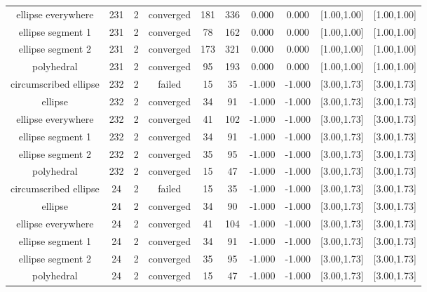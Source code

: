 \begin{tiny}
\begin{center}
\begin{tabular}{ c c c c c c c c c c }
    ellipse everywhere    &  231  &  2  & converged  &  181  &  336  &   0.000    &   0.000    & [1.00,1.00] & [1.00,1.00] \\
    ellipse segment 1     &  231  &  2  & converged  &   78  &  162  &   0.000    &   0.000    & [1.00,1.00] & [1.00,1.00] \\
    ellipse segment 2     &  231  &  2  & converged  &  173  &  321  &   0.000    &   0.000    & [1.00,1.00] & [1.00,1.00] \\
        polyhedral        &  231  &  2  & converged  &   95  &  193  &   0.000    &   0.000    & [1.00,1.00] & [1.00,1.00] \\
  circumscribed ellipse   &  232  &  2  &   failed   &   15  &   35  &   -1.000   &   -1.000   & [3.00,1.73] & [3.00,1.73] \\
         ellipse          &  232  &  2  & converged  &   34  &   91  &   -1.000   &   -1.000   & [3.00,1.73] & [3.00,1.73] \\
    ellipse everywhere    &  232  &  2  & converged  &   41  &  102  &   -1.000   &   -1.000   & [3.00,1.73] & [3.00,1.73] \\
    ellipse segment 1     &  232  &  2  & converged  &   34  &   91  &   -1.000   &   -1.000   & [3.00,1.73] & [3.00,1.73] \\
    ellipse segment 2     &  232  &  2  & converged  &   35  &   95  &   -1.000   &   -1.000   & [3.00,1.73] & [3.00,1.73] \\
        polyhedral        &  232  &  2  & converged  &   15  &   47  &   -1.000   &   -1.000   & [3.00,1.73] & [3.00,1.73] \\
  circumscribed ellipse   &   24  &  2  &   failed   &   15  &   35  &   -1.000   &   -1.000   & [3.00,1.73] & [3.00,1.73] \\
         ellipse          &   24  &  2  & converged  &   34  &   90  &   -1.000   &   -1.000   & [3.00,1.73] & [3.00,1.73] \\
    ellipse everywhere    &   24  &  2  & converged  &   41  &  104  &   -1.000   &   -1.000   & [3.00,1.73] & [3.00,1.73] \\
    ellipse segment 1     &   24  &  2  & converged  &   34  &   91  &   -1.000   &   -1.000   & [3.00,1.73] & [3.00,1.73] \\
    ellipse segment 2     &   24  &  2  & converged  &   35  &   95  &   -1.000   &   -1.000   & [3.00,1.73] & [3.00,1.73] \\
        polyhedral        &   24  &  2  & converged  &   15  &   47  &   -1.000   &   -1.000   & [3.00,1.73] & [3.00,1.73] \\

\end{tabular}
\end{center}
\end{tiny}
